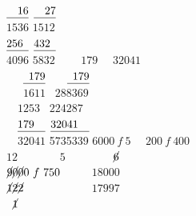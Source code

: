 $\underline{\phantom{00}16\vphantom{j}}$%
\hspace{70mm}%
$\underline{\phantom{00}27\vphantom{j}}$%
\\
$1536$%
\hspace{70mm}%
$1512$%
\\
$\underline{256\phantom{0}\vphantom{j}}$%
\hspace{70mm}%
$\underline{432\phantom{0}\vphantom{j}}$%
\\
$4096$%
\hspace{70mm}%
$5832$%
\pend%
\vspace{1.0em}%
\pstart%
\noindent%
\centering%
$\phantom{00}\phantom{00}179$%
\hspace{25mm}%
$\phantom{00}32041$%
\\
$\phantom{00}\phantom{0}\underline{\phantom{0}179\vphantom{j}}$%
\hspace{25mm}%
$\phantom{00}\phantom{0}\underline{\phantom{0}179\vphantom{j}}$%
\\
$\phantom{00}\phantom{0}1611$%
\hspace{25mm}%
$\phantom{0}288369$%
\\
$\phantom{00}1253\phantom{0}$%
\hspace{25mm}%
$224287\phantom{0}$%
\\
$\phantom{00}\underline{179\phantom{00}\vphantom{j}}$%
\hspace{25mm}%
$\underline{32041\phantom{00}\vphantom{j}}$%
\\
$\phantom{00}32041$%
\hspace{25mm}%
5735339
\pend%
\vspace{1.0em}%
\pstart%
\noindent%
\centering%
$6000\ f\ 5\phantom{00}$%
\hspace{75mm}%
$200\ f\ 400$%
\\
$12\phantom{00\ f\ 00}$%
\hspace{75mm}%
$\phantom{0}5\phantom{00\ f\ 000}$%
\pend%
\vspace{0.5em}%
\pstart%
\noindent%
\centering%
$\phantom{\cancel{0}}\cancel{6}\phantom{\cancel{0}0\ f\ 000}$%
\hspace{20mm}%
$\phantom{00\ f\ 0}\phantom{00000}$%
\\
$\cancel{9}\cancel{0}\cancel{0}0\ f\ 750$%
\hspace{20mm}%
$\phantom{00\ f\ 0}18000$%
\\
$\cancel{1}\cancel{2}\cancel{2}\phantom{0\ f\ 000}$%
\hspace{20mm}%
$\phantom{00\ f\ 0}17997$%
\\
$\phantom{\cancel{0}}\cancel{1}\phantom{\cancel{0}0\ f\ 000}$%
